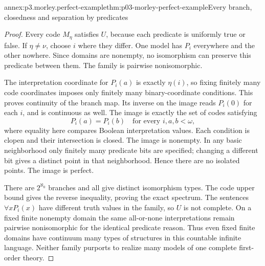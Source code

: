 \begin{annexitem}{annex:p3.morley.perfect-example}{thm:p03-morley-perfect-example}{Every branch, closedness and separation by predicates}
\begin{proof}
Every code \(M_\eta\) satisfies \(U\), because
each predicate is uniformly true or false.
If \(\eta\ne\nu\), choose \(i\) where they
differ. One model has \(P_i\) everywhere and
the other nowhere. Since domains are nonempty,
no isomorphism can preserve this predicate
between them. The family is pairwise
nonisomorphic.

The interpretation coordinate for \(P_i(a)\)
is exactly \(\eta(i)\), so fixing finitely
many code coordinates imposes only finitely
many binary-coordinate conditions.
This proves continuity of the branch map.
Its inverse on the image reads \(P_i(0)\)
for each \(i\), and is continuous as well.
The image is exactly the set of codes
satisfying
\[
 P_i(a)=P_i(b)\quad\text{for every }i,a,b<\omega,
\]
where equality here compares Boolean
interpretation values. Each condition is
clopen and their intersection is closed.
The image is nonempty.
In any basic neighborhood only finitely
many predicate bits are specified; changing
a different bit gives a distinct point
in that neighborhood. Hence there are
no isolated points. The image is perfect.

There are \(2^{\aleph_0}\) branches and all
give distinct isomorphism types. The code
upper bound gives the reverse inequality,
proving the exact spectrum.
The sentences \(\forall xP_i(x)\) have
different truth values in the family, so
\(U\) is not complete.
On a fixed finite nonempty domain the same
all-or-none interpretations remain
pairwise nonisomorphic for the identical
predicate reason.
Thus even fixed finite domains have
continuum many types of structures in
this countable infinite language.
Neither family purports to realize many
models of one complete first-order theory.
\end{proof}
\end{annexitem}

